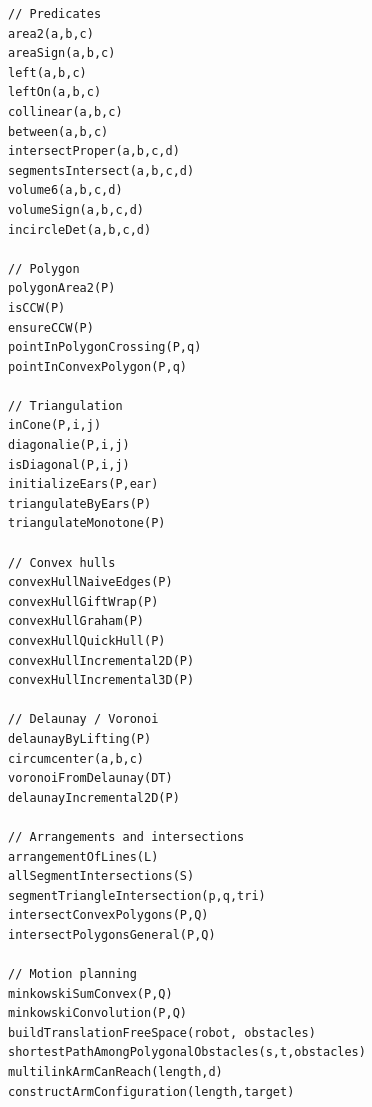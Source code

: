 \documentclass[11pt]{article}
\begin{document}
\begin{verbatim}
// Predicates
area2(a,b,c)
areaSign(a,b,c)
left(a,b,c)
leftOn(a,b,c)
collinear(a,b,c)
between(a,b,c)
intersectProper(a,b,c,d)
segmentsIntersect(a,b,c,d)
volume6(a,b,c,d)
volumeSign(a,b,c,d)
incircleDet(a,b,c,d)

// Polygon
polygonArea2(P)
isCCW(P)
ensureCCW(P)
pointInPolygonCrossing(P,q)
pointInConvexPolygon(P,q)

// Triangulation
inCone(P,i,j)
diagonalie(P,i,j)
isDiagonal(P,i,j)
initializeEars(P,ear)
triangulateByEars(P)
triangulateMonotone(P)

// Convex hulls
convexHullNaiveEdges(P)
convexHullGiftWrap(P)
convexHullGraham(P)
convexHullQuickHull(P)
convexHullIncremental2D(P)
convexHullIncremental3D(P)

// Delaunay / Voronoi
delaunayByLifting(P)
circumcenter(a,b,c)
voronoiFromDelaunay(DT)
delaunayIncremental2D(P)

// Arrangements and intersections
arrangementOfLines(L)
allSegmentIntersections(S)
segmentTriangleIntersection(p,q,tri)
intersectConvexPolygons(P,Q)
intersectPolygonsGeneral(P,Q)

// Motion planning
minkowskiSumConvex(P,Q)
minkowskiConvolution(P,Q)
buildTranslationFreeSpace(robot, obstacles)
shortestPathAmongPolygonalObstacles(s,t,obstacles)
multilinkArmCanReach(length,d)
constructArmConfiguration(length,target)
\end{verbatim}
\end{document}
